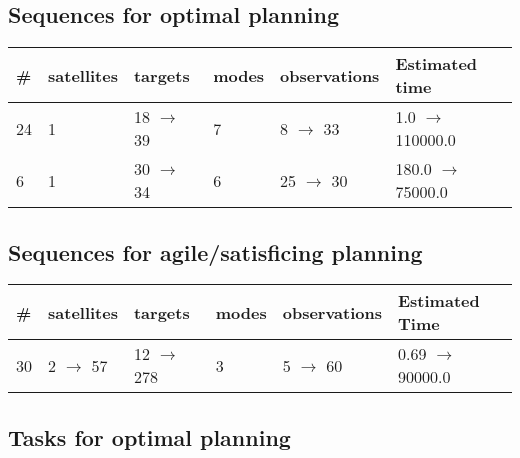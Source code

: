 \documentclass{article}
\begin{document}
                            \subsection*{Sequences for optimal planning}

                            \begin{center}
                            \begin{tabular}{@{}l|l|l|l|l|l@{}}
                            \# & satellites & targets & modes & observations & Estimated time\\\midrule
                            24&1&18 $\rightarrow$ 39&7&8 $\rightarrow$ 33&1.0 $\rightarrow$ 110000.0\\
6&1&30 $\rightarrow$ 34&6&25 $\rightarrow$ 30&180.0 $\rightarrow$ 75000.0
                            \end{tabular}
                            \end{center}
                    
                         \subsection*{Sequences for agile/satisficing planning}

                        \begin{center}
                        \begin{tabular}{@{}l|l|l|l|l|l@{}}
                        \# & satellites & targets & modes & observations & Estimated Time\\\midrule
                        30&2 $\rightarrow$ 57&12 $\rightarrow$ 278&3&5 $\rightarrow$ 60&0.69 $\rightarrow$ 90000.0
                        \end{tabular}
                        \end{center}
                    
                                \subsection*{Tasks for optimal planning}
                                
\end{document}
